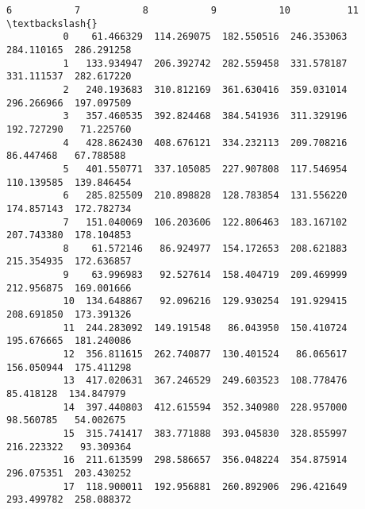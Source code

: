 \documentclass[11pt]{article}
\begin{document}
\begin{Verbatim}[commandchars=\\\{\}]
                      6           7           8           9           10          11  \textbackslash{}
          0    61.466329  114.269075  182.550516  246.353063  284.110165  286.291258   
          1   133.934947  206.392742  282.559458  331.578187  331.111537  282.617220   
          2   240.193683  310.812169  361.630416  359.031014  296.266966  197.097509   
          3   357.460535  392.824468  384.541936  311.329196  192.727290   71.225760   
          4   428.862430  408.676121  334.232113  209.708216   86.447468   67.788588   
          5   401.550771  337.105085  227.907808  117.546954  110.139585  139.846454   
          6   285.825509  210.898828  128.783854  131.556220  174.857143  172.782734   
          7   151.040069  106.203606  122.806463  183.167102  207.743380  178.104853   
          8    61.572146   86.924977  154.172653  208.621883  215.354935  172.636857   
          9    63.996983   92.527614  158.404719  209.469999  212.956875  169.001666   
          10  134.648867   92.096216  129.930254  191.929415  208.691850  173.391326   
          11  244.283092  149.191548   86.043950  150.410724  195.676665  181.240086   
          12  356.811615  262.740877  130.401524   86.065617  156.050944  175.411298   
          13  417.020631  367.246529  249.603523  108.778476   85.418128  134.847979   
          14  397.440803  412.615594  352.340980  228.957000   98.560785   54.002675   
          15  315.741417  383.771888  393.045830  328.855997  216.223322   93.309364   
          16  211.613599  298.586657  356.048224  354.875914  296.075351  203.430252   
          17  118.900011  192.956881  260.892906  296.421649  293.499782  258.088372   
          

\end{Verbatim}
\end{document}
